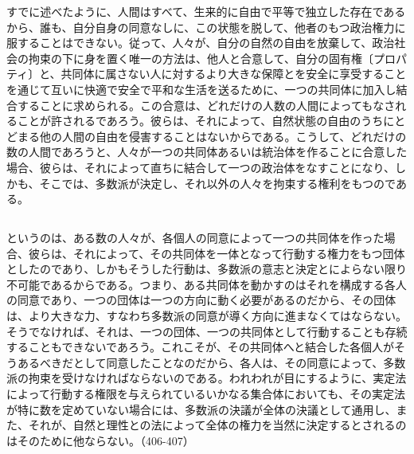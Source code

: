 すでに述べたように、人間はすべて、生来的に自由で平等で独立した存在であるから、誰も、自分自身の同意なしに、この状態を脱して、他者のもつ政治権力に服することはできない。従って、人々が、自分の自然の自由を放棄して、政治社会の拘束の下に身を置く唯一の方法は、他人と合意して、自分の固有権〔プロパティ〕と、共同体に属さない人に対するより大きな保障とを安全に享受することを通じて互いに快適で安全で平和な生活を送るために、一つの共同体に加入し結合することに求められる。この合意は、どれだけの人数の人間によってもなされることが許されるであろう。彼らは、それによって、自然状態の自由のうちにとどまる他の人間の自由を侵害することはないからである。こうして、どれだけの数の人間であろうと、人々が一つの共同体あるいは統治体を作ることに合意した場合、彼らは、それによって直ちに結合して一つの政治体をなすことになり、しかも、そこでは、多数派が決定し、それ以外の人々を拘束する権利をもつのである。

\subsection{}




というのは、ある数の人々が、各個人の同意によって一つの共同体を作った場合、彼らは、それによって、その共同体を一体となって行動する権力をもつ団体としたのであり、しかもそうした行動は、多数派の意志と決定とによらない限り不可能であるからである。つまり、ある共同体を動かすのはそれを構成する各人の同意であり、一つの団体は一つの方向に動く必要があるのだから、その団体は、より大きな力、すなわち多数派の同意が導く方向に進まなくてはならない。そうでなければ、それは、一つの団体、一つの共同体として行動することも存続することもできないであろう。これこそが、その共同体へと結合した各個人がそうあるべきだとして同意したことなのだから、各人は、その同意によって、多数派の拘束を受けなければならないのである。われわれが目にするように、実定法によって行動する権限を与えられているいかなる集合体においても、その実定法が特に数を定めていない場合には、多数派の決議が全体の決議として通用し、また、それが、自然と理性との法によって全体の権力を当然に決定するとされるのはそのために他ならない。（406-407）

\subsection{}


